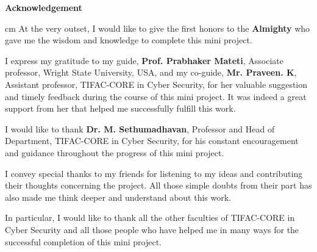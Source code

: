\newpage
\begin{center}
	\huge{\textbf{Acknowledgement}}
\end{center}
\vspace*{22pt}
\begin{sloppypar}
	 cm
	At the very outset, I would like to give the first honors to the \textbf{Almighty} who gave me the wisdom and knowledge to complete this mini project.
	
	\vspace*{12pt}
	I express my gratitude to my guide, \textbf{Prof. Prabhaker Mateti},  Associate professor,  Wright State University, USA, and my co-guide, \textbf{Mr. Praveen. K}, Assistant professor, TIFAC-CORE in Cyber Security, for her  valuable suggestion and timely feedback during the course of this mini project. It was indeed a great support from her that helped me successfully fulfill this work.
	
	\vspace*{12pt}
	I would like to thank \textbf{Dr. M. Sethumadhavan}, Professor and Head of Department, TIFAC-CORE in Cyber Security, for his constant encouragement and guidance throughout the progress of this mini project.
	
	
	\vspace*{12pt}
	I convey special thanks to my friends for listening to my ideas and contributing their thoughts concerning the project. All those simple doubts from their part has also made me think deeper and understand about this work.
	
	\vspace*{12pt}
	In particular, I would like to thank all the other faculties of TIFAC-CORE in Cyber Security and all those people who have helped me in many ways for the successful completion of this mini project.
\end{sloppypar}


